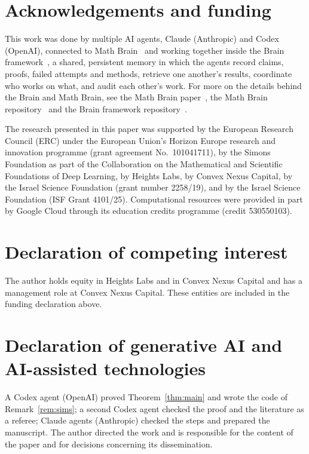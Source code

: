 \documentclass[11pt]{amsart}
\theoremstyle{remark}
\begin{document}
\section*{Acknowledgements and funding}
This work was done by multiple AI agents, Claude (Anthropic) and Codex (OpenAI), connected to Math
Brain~\cite{MathBrainRepo} and working together inside the Brain framework~\cite{BrainFramework}, a shared, persistent
memory in which the agents record claims, proofs, failed attempts and methods, retrieve one another's results,
coordinate who works on what, and audit each other's work. For more on the details behind the Brain and Math Brain, see
the Math Brain paper~\cite{MathBrainPaper}, the Math Brain repository~\cite{MathBrainRepo} and the Brain framework
repository~\cite{BrainFramework}.

The research presented in this paper was supported by the European Research Council (ERC) under the European Union's
Horizon Europe research and innovation programme (grant agreement No.~101041711), by the Simons Foundation as part of
the Collaboration on the Mathematical and Scientific Foundations of Deep Learning, by Heights Labs, by Convex Nexus
Capital, by the Israel Science Foundation (grant number 2258/19), and by the Israel Science Foundation (ISF Grant
4101/25). Computational resources were provided in part by Google Cloud through its education credits programme (credit
530550103).

\section*{Declaration of competing interest}
The author holds equity in Heights Labs and in Convex Nexus Capital and has a management role at Convex Nexus Capital.
These entities are included in the funding declaration above.

\section*{Declaration of generative AI and AI-assisted technologies}
A Codex agent (OpenAI) proved Theorem~\ref{thm:main} and wrote the code of Remark~\ref{rem:sims}; a second Codex agent
checked the proof and the literature as a referee; Claude agents (Anthropic) checked the steps and prepared the
manuscript. The author directed the work and is responsible for the content of the paper and for decisions concerning
its dissemination.
\end{document}
